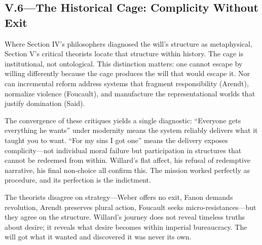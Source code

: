 \subsection*{V.6—The Historical Cage: Complicity Without Exit}
\label{ssec:v-historical-cage}

Where Section IV's philosophers diagnosed the will's structure as metaphysical, Section V's
critical theorists locate that structure within history. The cage is institutional, not
ontological. This distinction matters: one cannot escape by willing differently because the
cage produces the will that would escape it. Nor can incremental reform address systems that
fragment responsibility (Arendt), normalize violence (Foucault), and manufacture the
representational worlds that justify domination (Said).

The convergence of these critiques yields a single diagnostic: ``Everyone gets everything he
wants'' under modernity means the system reliably delivers what it taught you to want. ``For
my sins I got one'' means the delivery exposes complicity—not individual moral failure but
participation in structures that cannot be redeemed from within. Willard's flat affect, his
refusal of redemptive narrative, his final non-choice all confirm this. The mission worked
perfectly as procedure, and its perfection is the indictment.

The theorists disagree on strategy—Weber offers no exit, Fanon demands revolution, Arendt
preserves plural action, Foucault seeks micro-resistances—but they agree on the structure.
Willard's journey does not reveal timeless truths about desire; it reveals what desire becomes
within imperial bureaucracy. The will got what it wanted and discovered it was never its own.
